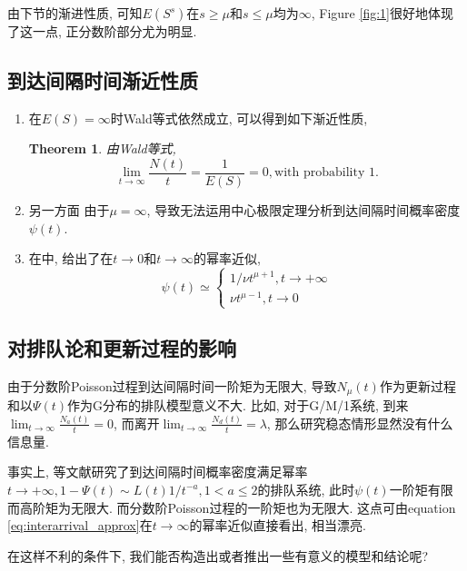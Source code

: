 \documentclass[a4paper, 12pt]{ctexart}
\newtheorem{theorem}{Theorem}[section]
\begin{document}
由下节的渐进性质, 可知$E(S^s)$在$s\geq\mu$和$s\leq\mu$均为$\infty$, Figure \ref{fig:1}很好地体现了这一点, 正分数阶部分尤为明显.

\subsection{到达间隔时间渐近性质}
\begin{enumerate}
\item 在$E(S)=\infty$时Wald等式依然成立,   可以得到如下渐近性质,
\begin{theorem}
由Wald等式,
\begin{equation}
\lim_{t\rightarrow \infty}\frac{N(t)}{t}=\frac{1}{E(S)}=0,   \text{with probability 1}. 
\end{equation}
\end{theorem}
\item 另一方面   由于$\mu=\infty$,   导致无法运用中心极限定理分析到达间隔时间概率密度$\psi (t)$. 

\item 在\cite{1}中, 给出了在$t\rightarrow 0$和$t\rightarrow \infty$的幂率近似,
\begin{equation}\label{eq:interarrival_approx}
\tag{分数阶Poisson到达间隔时间概率密度幂率近似}
\psi (t) \simeq \begin{cases}
1/\nu t^{\mu +1},  t\rightarrow +\infty \\
\nu t^{\mu -1}, t\rightarrow 0
\end{cases}
\end{equation}
\end{enumerate}

\subsection{对排队论和更新过程的影响}
由于分数阶Poisson过程到达间隔时间一阶矩为无限大,   导致$N_\mu(t)$作为更新过程和以$\Psi(t)$作为G分布的排队模型意义不大. 比如,   对于G/M/1系统,   到来$\lim _{t\rightarrow \infty}\frac{N_a(t)}{t} =0$,   而离开$ \lim _{t\rightarrow \infty} \frac{N_d(t)}{t}=\lambda$,   那么研究稳态情形显然没有什么信息量.

事实上,   \cite{12}\cite{13}\cite{14}等文献研究了到达间隔时间概率密度满足幂率$t\rightarrow +\infty ,  1-\Psi (t)\sim L(t)1/t^{-a} ,  1<a\leq 2$的排队系统,   此时$\psi (t)$一阶矩有限而高阶矩为无限大. 而分数阶Poisson过程的一阶矩也为无限大. 这点可由equation \eqref{eq:interarrival_approx}在$t\rightarrow \infty$的幂率近似直接看出, 相当漂亮.

在这样不利的条件下, 我们能否构造出或者推出一些有意义的模型和结论呢?
\end{document}
